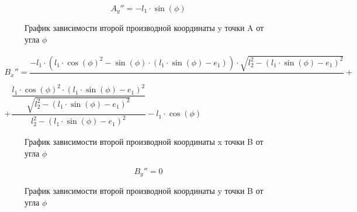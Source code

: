 \begin{equation}\label{eq:yAdphi2}
	A_y''=-l_1\cdot\sin(\phi)
\end{equation}

\begin{figure}[H]
	\centering
	\caption{График зависимости второй производной координаты y точки A от угла $\phi$}
\end{figure}
\newpage

\begin{eqnarray}\label{eq:xBdphi2}
	B_x''= \dfrac{-l_1\cdot(l_1\cdot\cos(\phi)^2 - \sin(\phi)\cdot (l_1\cdot\sin(\phi) - e_1))\cdot \sqrt{l_2^2 - (l_1\cdot\sin(\phi) - e_1)^2}}{} + \nonumber \\ + \dfrac{\dfrac{l_1\cdot\cos(\phi)^2\cdot(l_1\cdot\sin(\phi)-e_1)^2}{\sqrt{l_2^2 - (l_1\cdot \sin(\phi) - e_1)^2}}}{l_2^2 - (l_1\cdot \sin(\phi) - e_1)^2} - l_1\cdot\cos(\phi)
\end{eqnarray}

\begin{figure}[H]
	\centering
	\caption{График зависимости второй производной координаты x точки B от угла $\phi$}
\end{figure}
\newpage

\begin{equation}\label{eq:yBdphi2}
	B_y''= 0
\end{equation}

\begin{figure}[H]
	\centering
	\caption{График зависимости второй производной координаты y точки B от угла $\phi$}
\end{figure}
\newpage

